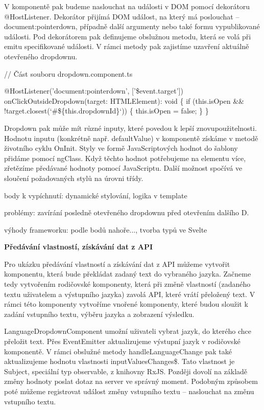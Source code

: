V komponentě pak budeme naslouchat na události v DOM pomocí dekorátoru @HostListener. 
Dekorátor přijímá DOM událost, na který má poslouchat -- document:pointerdown, případně další argumenty nebo také formu vypublikované události. 
Pod dekorátorem pak definujeme obslužnou metodu, která se volá při emitu specifikované události. V rámci metody pak zajistíme uzavření aktuálně otevřeného dropdownu.

\begin{prog}
// Část souboru dropdown.component.ts

@HostListener('document:pointerdown', ['\$event.target'])
onClickOutsideDropdown(target: HTMLElement): void \{
  if (this.isOpen && !target.closest(`#\$\{this.dropdownId\}`)) \{
    this.isOpen = false;
  \}
\}
\end{prog}

Dropdown pak může mít různé inputy, které povedou k lepší znovupoužitelnosti. Hodnotu inputu (konkrétně např. defaultValue) v komponentě získáme v metodě životního cyklu OnInit. 
Styly ve formě JavaScriptových hodnot do šablony přidáme pomocí ngClass. Když těchto hodnot potřebujeme na elementu více, zřetězíme předávané hodnoty pomocí JavaScriptu. 
Další možnost spočívá ve sloučení požadovaných stylů na úrovni třídy.

\begin{citemize}
	\item body k vypíchnutí: dynamické stylování, logika v template
	\item problémy: zavírání posledně otevřeného dropdownu před otevřením dalšího D.
	\item výhody frameworku: podle bodů nahoře..., tvorba typů ve Svelte
\end{citemize}

\begin{flushleft}
  \textbf{Předávání vlastností, získávání dat z API}
\end{flushleft}

Pro ukázku předávání vlastností a získávání dat z API můžeme vytvořit komponentu, která bude překládat zadaný text do vybraného jazyka. 
Začneme tedy vytvořením rodičovské komponenty, která při změně vlastností (zadaného textu uživatelem a výstupního jazyka) zavolá API, které vrátí přeložený text. 
V rámci této komponenty vytvoříme vnořené komponenty, které budou sloužit k zadání vstupního textu, výběru jazyka a zobrazení výsledku. 

LanguageDropdownComponent umožní uživateli vybrat jazyk, do kterého chce přeložit text. 
Přes EventEmitter aktualizujeme výstupní jazyk v rodičovské komponentě. V rámci obslužné metody handleLanguageChange pak také aktualizujeme hodnotu vlastnosti inputValuesChanges\$.
Tato vlastnost je Subject, speciální typ observable, z knihovny RxJS. Později dovolí na základě změny hodnoty poslat dotaz na server ve správný moment. 
Podobným způsobem poté můžeme registrovat událost změny vstupního textu -- naslouchat na změnu vstupního textu.

